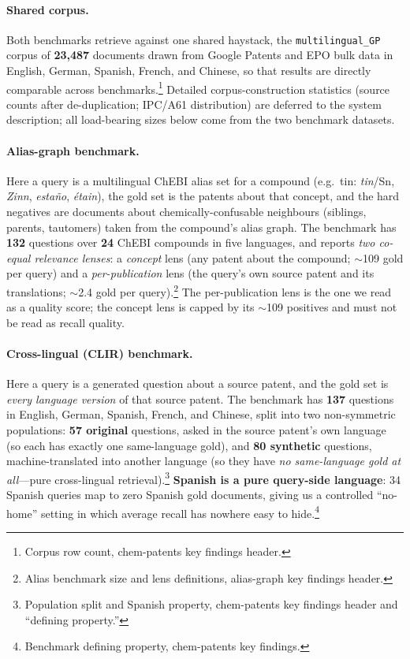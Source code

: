 \documentclass[11pt]{article}
\begin{document}
\paragraph{Shared corpus.}
Both benchmarks retrieve against one shared haystack, the
\texttt{multilingual\_GP} corpus of \textbf{23{,}487} documents drawn from
Google Patents and EPO bulk data in English, German, Spanish, French, and
Chinese, so that results are directly comparable across benchmarks.\footnote{%
Corpus row count, chem-patents key findings header.} Detailed
corpus-construction statistics (source counts after de-duplication; IPC/A61
distribution) are deferred to the system description; all load-bearing sizes
below come from the two benchmark datasets.

\paragraph{Alias-graph benchmark.}
Here a query is a multilingual ChEBI alias set for a compound (e.g.\ tin:
\emph{tin}/Sn, \emph{Zinn}, \emph{esta\~no}, \emph{\'etain}), the gold set is the
patents about that concept, and the hard negatives are documents about
chemically-confusable neighbours (siblings, parents, tautomers) taken from the
compound's alias graph. The benchmark has \textbf{132} questions over
\textbf{24} ChEBI compounds in five languages, and reports \emph{two co-equal
relevance lenses}: a \emph{concept} lens (any patent about the compound;
$\sim$109 gold per query) and a \emph{per-publication} lens (the query's own
source patent and its translations; $\sim$2.4 gold per query).\footnote{Alias
benchmark size and lens definitions, alias-graph key findings header.} The
per-publication lens is the one we read as a quality score; the concept lens is
capped by its $\sim$109 positives and must not be read as recall quality.

\paragraph{Cross-lingual (CLIR) benchmark.}
Here a query is a generated question about a source patent, and the gold set is
\emph{every language version} of that source patent. The benchmark has
\textbf{137} questions in English, German, Spanish, French, and Chinese, split
into two non-symmetric populations: \textbf{57 original} questions, asked in the
source patent's own language (so each has exactly one same-language gold), and
\textbf{80 synthetic} questions, machine-translated into another language (so
they have \emph{no same-language gold at all}---pure cross-lingual
retrieval).\footnote{Population split and Spanish property, chem-patents key
findings header and ``defining property.''} \textbf{Spanish is a pure
query-side language}: 34 Spanish queries map to zero Spanish gold documents,
giving us a controlled ``no-home'' setting in which average recall has nowhere
easy to hide.\footnote{Benchmark defining property, chem-patents key findings.}
\end{document}
